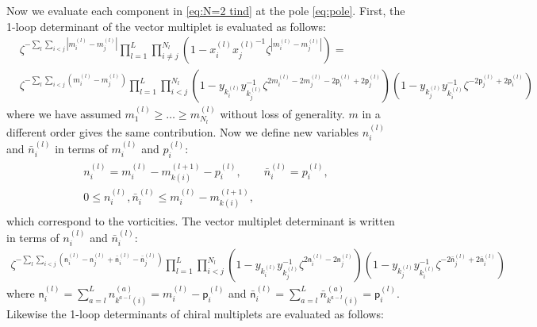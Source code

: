 \documentclass[a4paper,11pt]{article}
\begin{document}
Now we evaluate each component in \eqref{eq:N=2 tind} at the pole \eqref{eq:pole}. First, the 1-loop determinant of the vector multiplet is evaluated as follows:
\begin{align}
& \zeta^{-\sum_l \sum_{i < j} |m^{(l)}_i-m^{(l)}_j|} \prod_{l = 1}^L \prod_{i \neq j}^{N_l} \left(1-x^{(l)}_i {x^{(l)}_j}^{-1} \zeta^{|m^{(l)}_i-m^{(l)}_j|}\right) = \nonumber \\
& \zeta^{-\sum_l \sum_{i < j} (m^{(l)}_i-m^{(l)}_j)} \prod_{l = 1}^L \prod_{i < j}^{N_l} \left(1-y_{k^{(l)}_i} y_{k^{(l)}_j}^{-1} \zeta^{2 m^{(l)}_i-2 m^{(l)}_j-2 \mathsf p^{(l)}_i+2 \mathsf p^{(l)}_j}\right) \left(1-y_{k^{(l)}_j} y_{k^{(l)}_i}^{-1} \zeta^{-2 \mathsf p^{(l)}_j+2 \mathsf p^{(l)}_i}\right)
\end{align}
where we have assumed $m^{(l)}_1 \geq \ldots \geq m^{(l)}_{N_l}$ without loss of generality. $m$ in a different order gives the same contribution. Now we define new variables $n^{(l)}_i$ and $\bar n^{(l)}_i$ in terms of $m^{(l)}_i$ and $p^{(l)}_i$:
\begin{gather}
\begin{gathered}
n^{(l)}_i = m^{(l)}_i-m^{(l+1)}_{k(i)}-p^{(l)}_i, \qquad \bar n^{(l)}_i = p^{(l)}_i, \\
0 \leq n^{(l)}_i, \bar n^{(l)}_i \leq m^{(l)}_i-m^{(l+1)}_{k(i)},
\end{gathered}
\end{gather}
which correspond to the vorticities. The vector multiplet determinant is written in terms of $n^{(l)}_i$ and $\bar n^{(l)}_i$:
\begin{align}
\label{eq:vector}
\zeta^{-\sum_l \sum_{i < j} (\mathsf n^{(l)}_i-\mathsf n^{(l)}_j+\mathsf{\bar n}^{(l)}_i-\mathsf{\bar n}^{(l)}_j)} \prod_{l = 1}^L \prod_{i < j}^{N_l} \left(1-y_{k^{(l)}_i} y_{k^{(l)}_j}^{-1} \zeta^{2 \mathsf n^{(l)}_i-2 \mathsf n^{(l)}_j}\right) \left(1-y_{k^{(l)}_j} y_{k^{(l)}_i}^{-1} \zeta^{-2 \mathsf{\bar n}^{(l)}_j+2 \mathsf{\bar n}^{(l)}_i}\right)
\end{align}
where $\mathsf n^{(l)}_i = \sum_{a = l}^L n^{(a)}_{k^{a-l}(i)} = m^{(l)}_i-\mathsf p^{(l)}_i$ and $\mathsf{\bar n}^{(l)}_i = \sum_{a = l}^L \bar n^{(a)}_{k^{a-l}(i)} = \mathsf p^{(l)}_i$. Likewise the 1-loop determinants of chiral multiplets are evaluated as follows:
\end{document}
